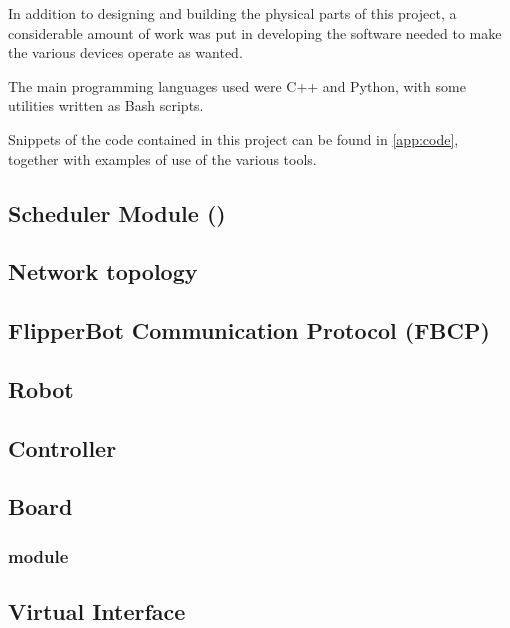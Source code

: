 In addition to designing and building the physical parts of this
project, a considerable amount of work was put in developing the
software needed to make the various devices operate as wanted.

The main programming languages used were C++ and Python, with some
utilities written as Bash scripts.

Snippets of the code contained in this project can be found in
\autoref{app:code}, together with examples of use of the various tools.


\subsection{Scheduler Module (\ScheMo{})}
  \label{ssec:schemo}
  

\subsection{Network topology}
  \label{ssec:network}
  

\subsection{FlipperBot Communication Protocol (FBCP)}
  \label{ssec:fbcp}
  
  
\subsection{Robot}
  \label{ssec:robot}
  
  
\subsection{Controller}
  \label{ssec:contr}
  
  
\subsection{Board}
  \label{ssec:board}
  
  \subsubsection{ module}
  
\subsection{Virtual Interface}
  \label{ssec:vcontr}
  

